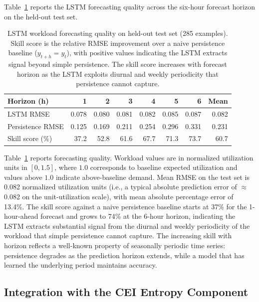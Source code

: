 \documentclass[runningheads]{llncs}
\begin{document}
Table~\ref{tab:lstm} reports the LSTM forecasting quality across the six-hour forecast horizon on the held-out test set.

\begin{table}[ht]
\caption{LSTM workload forecasting quality on held-out test set (285 examples). Skill score is the relative RMSE improvement over a naive persistence baseline ($y_{t+h} = y_t$), with positive values indicating the LSTM extracts signal beyond simple persistence. The skill score increases with forecast horizon as the LSTM exploits diurnal and weekly periodicity that persistence cannot capture.}
\label{tab:lstm}
\centering
\footnotesize
\setlength{\tabcolsep}{6pt}
\begin{tabular}{lrrrrrrr}
\toprule
Horizon (h) & 1 & 2 & 3 & 4 & 5 & 6 & Mean \\
\midrule
LSTM RMSE          & 0.078 & 0.080 & 0.081 & 0.082 & 0.085 & 0.087 & 0.082 \\
Persistence RMSE   & 0.125 & 0.169 & 0.211 & 0.254 & 0.296 & 0.331 & 0.231 \\
Skill score (\%)   & 37.2  & 52.8  & 61.6  & 67.7  & 71.3  & 73.7  & 60.7 \\
\bottomrule
\end{tabular}
\end{table}

Table~\ref{tab:lstm} reports forecasting quality. Workload values are in normalized utilization units in $[0, 1.5]$, where $1.0$ corresponds to baseline expected utilization and values above $1.0$ indicate above-baseline demand. Mean RMSE on the test set is 0.082 normalized utilization units (i.e., a typical absolute prediction error of $\approx$0.082 on the unit-utilization scale), with mean absolute percentage error of 13.4\%. The skill score against a naive persistence baseline starts at 37\% for the 1-hour-ahead forecast and grows to 74\% at the 6-hour horizon, indicating the LSTM extracts substantial signal from the diurnal and weekly periodicity of the workload that simple persistence cannot capture. The increasing skill with horizon reflects a well-known property of seasonally periodic time series: persistence degrades as the prediction horizon extends, while a model that has learned the underlying period maintains accuracy.

\subsection{Integration with the CEI Entropy Component}
\end{document}
